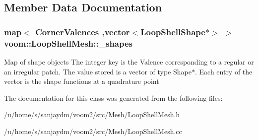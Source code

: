 \subsection{Member Data Documentation}
\hypertarget{classvoom_1_1_loop_shell_mesh_a95466b793ea0a50b017483aac2b4bfcd}{
\subsubsection[{\_\-shapes}]{\setlength{\rightskip}{0pt plus 5cm}map$<$ CornerValences ,vector$<${\bf LoopShellShape}$\ast$$>$ $>$ {\bf voom::LoopShellMesh::\_\-shapes}}}
\label{classvoom_1_1_loop_shell_mesh_a95466b793ea0a50b017483aac2b4bfcd}
Map of shape objects The integer key is the Valence corresponding to a regular or an irregular patch. The value stored is a vector of type Shape$\ast$. Each entry of the vector is the shape functions at a quadrature point 

The documentation for this class was generated from the following files:\begin{DoxyCompactItemize}
\item 
/u/home/s/sanjaydm/voom2/src/Mesh/LoopShellMesh.h\item 
/u/home/s/sanjaydm/voom2/src/Mesh/LoopShellMesh.cc\end{DoxyCompactItemize}
